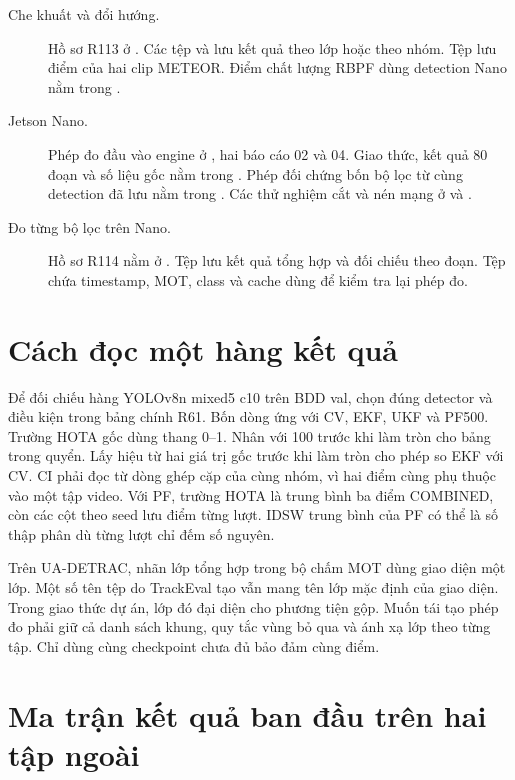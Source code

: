 \begin{description}
\item[Che khuất và đổi hướng.] Hồ sơ R113 ở . Các tệp  và  lưu kết quả theo lớp hoặc theo nhóm. Tệp  lưu điểm của hai clip METEOR. Điểm chất lượng RBPF dùng detection Nano nằm trong .
\item[Jetson Nano.] Phép đo đầu vào engine ở , hai báo cáo 02 và 04. Giao thức, kết quả 80 đoạn và số liệu gốc nằm trong . Phép đối chứng bốn bộ lọc từ cùng detection đã lưu nằm trong . Các thử nghiệm cắt và nén mạng ở  và .
\item[Đo từng bộ lọc trên Nano.] Hồ sơ R114 nằm ở . Tệp  lưu kết quả tổng hợp và đối chiếu theo đoạn. Tệp  chứa timestamp, MOT, class và cache dùng để kiểm tra lại phép đo.
\end{description}

\section{Cách đọc một hàng kết quả}
Để đối chiếu hàng YOLOv8n mixed5 c10 trên BDD val, chọn đúng detector và điều kiện trong bảng chính R61. Bốn dòng ứng với CV, EKF, UKF và PF500. Trường HOTA gốc dùng thang 0--1. Nhân với 100 trước khi làm tròn cho bảng trong quyển. Lấy hiệu từ hai giá trị gốc trước khi làm tròn cho phép so EKF với CV. CI phải đọc từ dòng ghép cặp của cùng nhóm, vì hai điểm cùng phụ thuộc vào một tập video. Với PF, trường HOTA là trung bình ba điểm COMBINED, còn các cột theo seed lưu điểm từng lượt. IDSW trung bình của PF có thể là số thập phân dù từng lượt chỉ đếm số nguyên.

Trên UA-DETRAC, nhãn lớp tổng hợp trong bộ chấm MOT dùng giao diện một lớp. Một số tên tệp do TrackEval tạo vẫn mang tên lớp mặc định của giao diện. Trong giao thức dự án, lớp đó đại diện cho phương tiện gộp. Muốn tái tạo phép đo phải giữ cả danh sách khung, quy tắc vùng bỏ qua và ánh xạ lớp theo từng tập. Chỉ dùng cùng checkpoint chưa đủ bảo đảm cùng điểm.
\section{Ma trận kết quả ban đầu trên hai tập ngoài}



